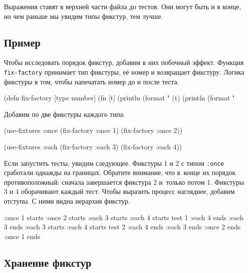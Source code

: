 Выражения ставят в верхней части файла до тестов. Они могут быть и в конце, но
чем раньше мы увидим типы фикстур, тем лучше.

\subsection{Пример}

Чтобы исследовать порядок фикстур, добавим в них побочный эффект. Функция
\verb|fix-factory| принимает тип фикстуры, её номер и возвращает
фикстуру. Логика фикстуры в том, чтобы напечатать номер до и после теста.


\begin{english}
  \begin{clojure}
(defn fix-factory [type number]
  (fn [t]
    (println (format "%
    (t)
    (println (format "%
  \end{clojure}
\end{english}

\noindent
Добавим по две фикстуры каждого типа:

\begin{english}
  \begin{clojure}
(use-fixtures :once
  (fix-factory :once 1)
  (fix-factory :once 2))

(use-fixtures :each
  (fix-factory :each 3)
  (fix-factory :each 4))
  \end{clojure}
\end{english}

Если запустить тесты, увидим следующее. Фикстуры 1 и 2 с типом \verb|:once|
сработали однажды на границах. Обратите внимание, что в~конце их порядок
противоположный: сначала завершается фикстура 2 и~только потом 1. Фикстуры 3 и 4
оборачивают каждый тест. Чтобы выразить процесс нагляднее, добавим отступы. С
ними видна иерархия фикстур.


\begin{english}
  \begin{clojure}
:once 1 starts
  :once 2 starts
    :each 3 starts
      :each 4 starts
        test 1
      :each 4 ends
    :each 3 ends
    :each 3 starts
      :each 4 starts
        test 2
      :each 4 ends
    :each 3 ends
  :once 2 ends
:once 1 ends
  \end{clojure}
\end{english}

\subsection{Хранение фикстур}

